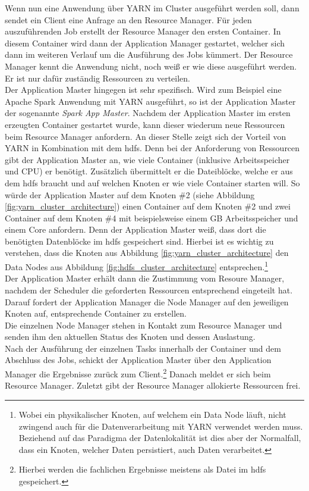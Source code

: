 \noindent
Wenn nun eine Anwendung über YARN im Cluster ausgeführt werden soll, dann sendet ein Client eine Anfrage an den Resource Manager. 
Für jeden auszuführenden Job erstellt der Resource Manager den ersten Container. In diesem Container wird dann der Application Manager gestartet, welcher sich dann im weiteren Verlauf um die Ausführung des Jobs kümmert. Der Resource Manager kennt die Anwendung nicht, noch weiß er wie diese ausgeführt werden. 
Er ist nur dafür zuständig Ressourcen zu verteilen.\\ 
Der Application Master hingegen ist sehr spezifisch. Wird zum Beispiel eine Apache Spark Anwendung mit YARN ausgeführt, so ist der Application Master der sogenannte \textit{Spark App Master}. Nachdem der Application Master im ersten erzeugten Container gestartet wurde, kann dieser wiederum neue Ressourcen beim Resource Manager anfordern. 
An dieser Stelle zeigt sich der Vorteil von YARN in Kombination mit dem \gls{hdfs}. Denn bei der Anforderung von Ressourcen gibt der Application Master an, wie viele Container (inklusive Arbeitsspeicher und CPU) er benötigt. Zusätzlich übermittelt er die Dateiblöcke, welche er aus dem \gls{hdfs} braucht und auf welchen Knoten er wie viele Container starten will. So würde der Application Master auf dem Knoten \#2 (siehe Abbildung \ref{fig:yarn_cluster_architecture}) einen Container auf dem Knoten \#2 und zwei Container auf dem Knoten \#4 mit beispielsweise einem GB Arbeitsspeicher und einem Core anfordern. 
Denn der Application Master weiß, dass dort die benötigten Datenblöcke im \gls{hdfs} gespeichert sind. Hierbei ist es wichtig zu verstehen, dass die Knoten aus Abbildung \ref{fig:yarn_cluster_architecture} den Data Nodes aus Abbildung \ref{fig:hdfs_cluster_architecture} entsprechen.\footnote{Wobei ein physikalischer Knoten, auf welchem ein Data Node läuft, nicht zwingend auch für die Datenverarbeitung mit YARN verwendet werden muss. Beziehend auf das Paradigma der Datenlokalität ist dies aber der Normalfall, dass ein Knoten, welcher Daten persistiert, auch Daten verarbeitet.}\\

\noindent
Der Application Master erhält dann die Zustimmung vom Resoure Manager, nachdem der Scheduler die geforderten Ressourcen entsprechend eingeteilt hat. Darauf fordert der Application Manager die Node Manager auf den jeweiligen Knoten auf, entsprechende Container zu erstellen.\\
Die einzelnen Node Manager stehen in Kontakt zum Resource Manager und senden ihm den aktuellen Status des Knoten und dessen Auslastung. \\
Nach der Ausführung der einzelnen Tasks innerhalb der Container und dem Abschluss des Jobs, schickt der Application Master über den Application Manager die Ergebnisse zurück zum Client.\footnote{Hierbei werden die fachlichen Ergebnisse meistens als Datei im \gls{hdfs} gespeichert.} Danach meldet er sich beim Resource Manager. Zuletzt gibt der Resource Manager allokierte Ressourcen frei.\\



